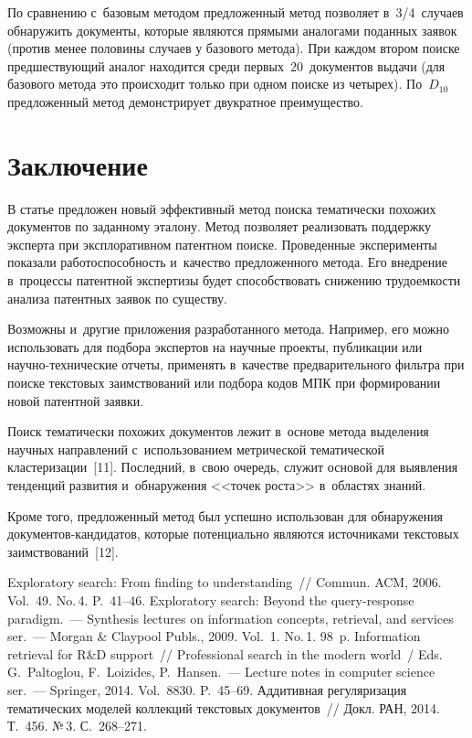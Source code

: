 \begin{multicols}{2}
  
  По сравнению с~базовым методом предложенный метод позволяет 
в~3/4~случаев обнаружить документы, которые являются прямыми аналогами 
поданных заявок (против менее половины случаев у базового метода). При 
каждом втором поиске предшествующий аналог находится среди 
первых~20~документов выдачи (для базового метода это происходит только 
при одном поиске из четырех). По~$D_{10}$ предложенный метод 
демонстрирует двукратное преимущество.
  
\section{Заключение}
     
  В статье предложен новый эффективный метод поиска тематически похожих 
документов по заданному эталону. Метод позволяет реализовать поддержку 
эксперта при эксплоративном патентном поиске. Проведенные эксперименты 
показали работоспособность и~качество предложенного метода. Его внедрение в~процессы патентной экспертизы будет способствовать снижению 
трудоемкости анализа патентных заявок по существу.
  
  Возможны и~другие приложения разработанного метода. Например, его 
можно использовать для подбора экспертов на научные проекты, публикации 
или на\-уч\-но-тех\-ни\-че\-ские отчеты, применять в~качестве предварительного 
фильтра при поиске текстовых заимствований или подбора кодов МПК при 
формировании новой патентной заявки. 
  
  Поиск тематически похожих документов лежит в~основе метода выделения 
научных направлений с~использованием метрической тематической 
клас\-те\-ри\-за\-ции~[11]. Последний, в~свою очередь, служит основой для 
выявления тенденций развития и~обнаружения <<точек роста>> в~областях 
знаний.
  
  Кроме того, предложенный метод был успешно использован для 
обнаружения до\-ку\-мен\-тов-кан\-ди\-да\-тов, которые потенциально являются 
источниками текстовых заимствований~[12].
  
{\small\frenchspacing
 {%
 \begin{thebibliography}{99}
 Exploratory search: From finding to understanding~// Commun. 
ACM, 2006. Vol.~49. No.\,4. P.~41--46.
 Exploratory search: Beyond the query-response paradigm.~--- 
Synthesis lectures on information concepts, retrieval, and services
ser.~--- Morgan \& Claypool Publs., 2009. Vol.~1. No.\,1.  
98~p.
 Information 
retrieval for R\&D support~// Professional search in the modern world~/ Eds.  G.~Paltoglou, 
F.~Loizides, P.~Hansen.~--- Lecture notes in computer science ser.~---  
Springer, 2014. Vol.~8830. P.~45--69.
Аддитивная регуляризация тематических моделей коллекций текстовых документов~//
Докл. РАН, 2014. Т.~456. №\,3. С.~268--271.



\end{thebibliography}}}
\end{multicols}
